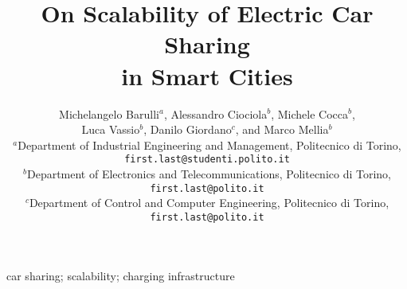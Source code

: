 \documentclass[a4paper, 10 pt, conference]{ieeetran}  %
\title{On Scalability of Electric Car Sharing\\ in Smart Cities}
\author{Michelangelo Barulli$^{a}$, Alessandro Ciociola$^{b}$, Michele Cocca$^{b}$,\\ Luca Vassio$^{b}$, Danilo Giordano$^{c}$,  and Marco Mellia$^{b}$  \\%
$^{a}$Department of Industrial Engineering and Management, Politecnico di Torino, \texttt{\small first.last@studenti.polito.it}\\%
$^{b}$Department of Electronics and Telecommunications, Politecnico di Torino, \texttt{\small first.last@polito.it}\\%
$^{c}$Department of Control and Computer Engineering, Politecnico di Torino, \texttt{\small first.last@polito.it}}%
\begin{document}



\maketitle





 \begin{IEEEkeywords}
car sharing; scalability; charging infrastructure
\end{IEEEkeywords}









%
%





\end{document}
